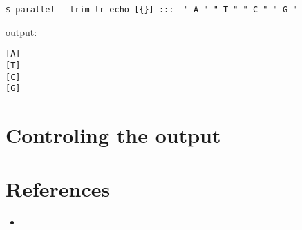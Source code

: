 \documentclass{article}
\begin{document}
\begin{lstlisting}
$ parallel --trim lr echo [{}] :::  " A " " T " " C " " G "
\end{lstlisting}
output:
\begin{lstlisting}
[A]
[T]
[C]
[G]
\end{lstlisting}

\section{Controling the output}


\section{References}
\begin{itemize}
\item{}
\end{itemize}
\end{document}
